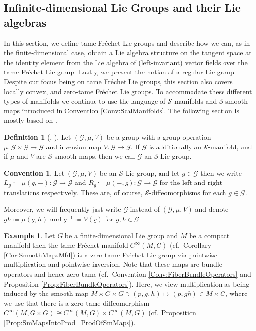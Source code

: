 \documentclass[12pt,a4paper]{article}
\theoremstyle{plain}
\theoremstyle{definition}
\newtheorem{definition}[theorem]{Definition}
\newtheorem{example}[theorem]{Example}
\newtheorem{convention}[theorem]{Convention}
\newcommand{\Scal}{\mathcal{S}}
\newcommand{\Gcal}{\mathcal{G}}
\begin{document}
\subsection{Infinite-dimensional Lie Groups and their Lie algebras}

In this section, we define tame Fréchet Lie groups and describe how we can, as in the finite-dimensional case, obtain a Lie algebra structure on the tangent space at the identity element from the Lie algebra of (left-invariant) vector fields over the tame Fréchet Lie group. Lastly, we present the notion of a regular Lie group. Despite our focus being on tame Fréchet Lie groups, this section also covers locally convex, and zero-tame Fréchet Lie groups. To accommodate these different types of manifolds we continue to use the language of $\Scal$-manifolds and $\Scal$-smooth maps introduced in Convention \ref{Conv:ScalManifolds}. The following section is mostly based on \cite[Section III.1]{InfDimLieneeb}.


\begin{definition}[{\cite[Definition III.1.1]{InfDimLieneeb}, \cite[p.~148]{hamilton}}]
Let $(\Gcal,\mu,V)$ be a group with a group operation $\mu:\Gcal\times \Gcal\to \Gcal$ and inversion map $V:\Gcal\to \Gcal$. If $\Gcal$ is additionally an $\Scal$-manifold, and if $\mu$ and $V$ are $\Scal$-smooth maps, then we call $\Gcal$ an $\Scal$-Lie group. 
\end{definition}

\begin{convention}
Let $(\Gcal,\mu,V)$ be an $\Scal$-Lie group, and let $g\in \Gcal$ then we write
$L_g\coloneqq \mu(g,-):\Gcal\to \Gcal$ and $R_g\coloneqq \mu(-,g):\Gcal\to \Gcal$ for the left and right translations respectively. These are, of course, $\Scal$-diffeomorphisms for each $g\in \Gcal$.

Moreover, we will frequently just write $\Gcal$ instead of $(\Gcal,\mu,V)$ and denote $gh\coloneqq\mu(g,h)$ and $g^{-1}\coloneqq V(g)$ for $g,h\in \Gcal$.
\end{convention}

\begin{example}
\label{Ex:C(M,G)}
Let $G$ be a finite-dimensional Lie group and $M$ be a compact manifold then the tame Fréchet manifold $C^\infty(M,G)$ (cf.~Corollary \ref{Cor:SmoothMapsMfd}) is a zero-tame Fréchet Lie group via pointwise multiplication and pointwise inversion. Note that these maps are bundle operators and hence zero-tame (cf.~Convention \ref{Conv:FiberBundleOperators} and Proposition \ref{Prop:FiberBundleOperators}). Here, we view multiplication as being induced by the smooth map
$M\times G\times G\ni (p,g,h)\mapsto (p,gh)\in M\times G$, where we use that there is a zero-tame diffeomorphism 
$C^\infty(M,G\times G)\cong C^\infty(M,G)\times C^\infty(M,G)$ (cf.~Proposition \ref{Prop:SmMapsIntoProd=ProdOfSmMaps}).
\end{example}
\end{document}
